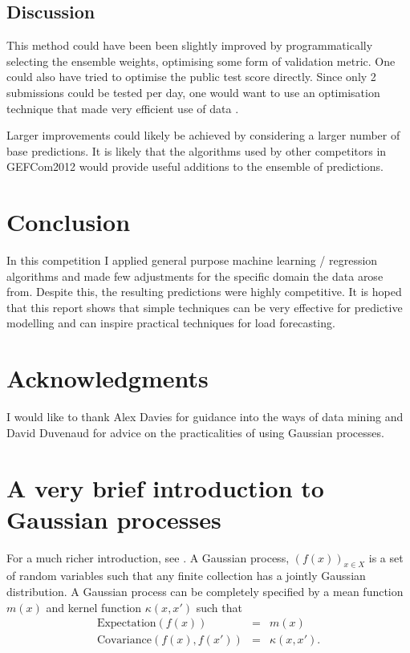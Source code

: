 \documentclass[final,authoryear,1p,times]{elsarticle}
\begin{document}
\subsection{Discussion}

This method could have been been slightly improved by programmatically selecting the ensemble weights, optimising some form of validation metric.
One could also have tried to optimise the public test score directly.
Since only 2 submissions could be tested per day, one would want to use an optimisation technique that made very efficient use of data \citep[e.g.][]{Osborne2009, snoek2012practical}.

Larger improvements could likely be achieved by considering a larger number of base predictions.
It is likely that the algorithms used by other competitors in GEFCom2012 would provide useful additions to the ensemble of predictions.

\section{Conclusion}

In this competition I applied general purpose machine learning / regression algorithms and made few adjustments for the specific domain the data arose from.
Despite this, the resulting predictions were highly competitive.
It is hoped that this report shows that simple techniques can be very effective for predictive modelling and can inspire practical techniques for load forecasting.

\section*{Acknowledgments}

I would like to thank Alex Davies for guidance into the ways of data mining and David Duvenaud for advice on the practicalities of using Gaussian processes.

\appendix

\section{A very brief introduction to Gaussian processes}

\label{sec:gp_appendix}

For a much richer introduction, see \cite{Rasmussen2006}.
A Gaussian process, $(f(x))_{x \in X}$ is a set of random variables such that any finite collection has a jointly Gaussian distribution.
A Gaussian process can be completely specified by a mean function $m(x)$ and kernel function $\kappa (x, x')$ such that
\begin{eqnarray}
\text{Expectation}(f(x)) & = & m(x) \\
\text{Covariance}(f(x), f(x')) & = & \kappa (x, x').
\end{eqnarray}
\end{document}
